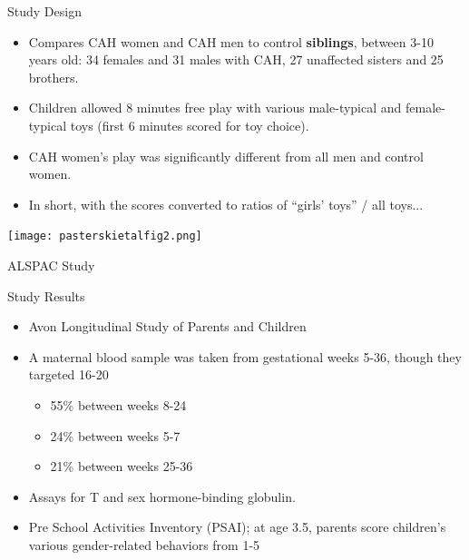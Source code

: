 \documentclass[hyperref={pdfpagelabels=false}]{beamer}
\begin{document}
\begin{frame}{\citet{pasterskietal2005}}
\begin{block}{Study Design}

	\begin{itemize}
	\item Compares CAH women and CAH men to control \textbf{siblings}, between 3-10 years old: 34 females and 31 males with CAH, 27 unaffected sisters and 25 brothers.
	\item Children allowed 8 minutes free play with various male-typical and female-typical toys (first 6 minutes scored for toy choice).
	\item CAH women's play was significantly different from all men and control women.
	\item In short, with the scores converted to ratios of ``girls' toys'' / all toys...
	\end{itemize}
	\end{block}
\end{frame}



\begin{frame}{}
\begin{center}
	\texttt{[image: pasterskietalfig2.png]}
	\end{center}
\end{frame}

\begin{frame}{ALSPAC Study \citep{hinesetal2002}}
\begin{block}{Study Results}
	\begin{itemize}
	\item Avon Longitudinal Study of Parents and Children \citep{alspac2001}
	\item A maternal blood sample was taken from gestational weeks 5-36, though they targeted 16-20
		\begin{itemize}
			\item 55\% between weeks 8-24
			\item 24\% between weeks 5-7
			\item 21\% between weeks 25-36
		\end{itemize}
	\item Assays for T and sex hormone-binding globulin.
	\item Pre School Activities Inventory (PSAI); at age 3.5, parents score children's various gender-related behaviors from 1-5
	\end{itemize}
\end{block}
\end{frame}
\end{document}
